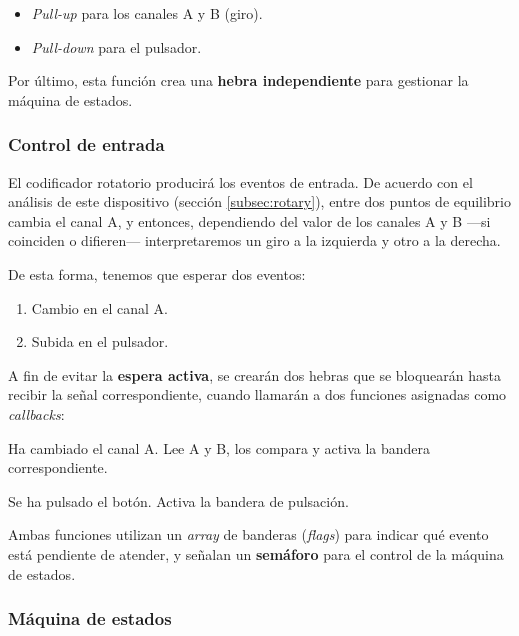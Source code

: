 \begin{itemize}
	\item \textit{Pull-up} para los canales A y B (giro).
	\item \textit{Pull-down} para el pulsador.
\end{itemize}

Por último, esta función crea una \textbf{hebra independiente} para gestionar la máquina de estados.

\subsubsection{Control de entrada}

El codificador rotatorio producirá los eventos de entrada. De acuerdo con el análisis de este dispositivo (sección \ref{subsec:rotary}), entre dos puntos de equilibrio cambia el canal A, y entonces, dependiendo del valor de los canales A y B ---si coinciden o difieren--- interpretaremos un giro a la izquierda y otro a la derecha.

De esta forma, tenemos que esperar dos eventos:

\begin{enumerate}
	\item Cambio en el canal A.
	\item Subida en el pulsador.
\end{enumerate}
	
A fin de evitar la \textbf{espera activa}, se crearán dos hebras que se bloquearán hasta recibir la señal correspondiente, cuando llamarán a dos funciones asignadas como \textit{callbacks}:

\begin{description}[style=nextline]
	\item[rot\_change()] Ha cambiado el canal A. Lee A y B, los compara y activa la bandera correspondiente.
	\item[rot\_push()] Se ha pulsado el botón. Activa la bandera de pulsación.
\end{description}

Ambas funciones utilizan un \textit{array} de banderas (\textit{flags}) para indicar qué evento está pendiente de atender, y señalan un \textbf{semáforo} para el control de la máquina de estados.

\subsubsection{Máquina de estados}

